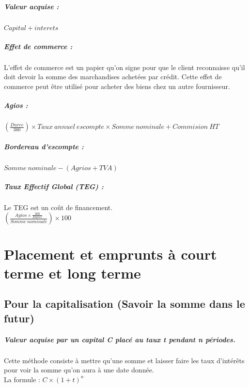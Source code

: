 \documentclass{report}
\begin{document}
\paragraph*{Valeur acquise :}
$Capital + interets$

\paragraph*{Effet de commerce :} L'effet de commerce est un papier qu'on signe pour que le client reconnaisse qu'il doit devoir la somme des marchandises achetées par crédit. Cette effet de commerce peut être utilisé pour acheter des biens chez un autre fournisseur.

\paragraph*{Agios :}
$(\frac{Duree}{360}) \times Taux\ annuel\ escompte \times Somme\ nominale + Commision\ HT$

\paragraph*{Bordereau d'escompte :}
$Somme\ nominale - (Agrios + TVA)$

\paragraph*{Taux Effectif Global (TEG) :} Le TEG est un coût de financement.
\\
{\Large$(\frac{Agios \times \frac{360}{Duree}}{Somme\ nominale}) \times 100$}

\chapter{Placement et emprunts à court terme et long terme}

\section{Pour la capitalisation (Savoir la somme dans le futur)}

\paragraph{Valeur acquise par un capital C placé au taux t pendant n périodes.} 
Cette méthode consiste à mettre qu'une somme et laisser faire les taux d'intérêts pour voir la somme qu'on aura à une date donnée.
\\ La formule : $C \times (1 + t)^{n}$
\end{document}
